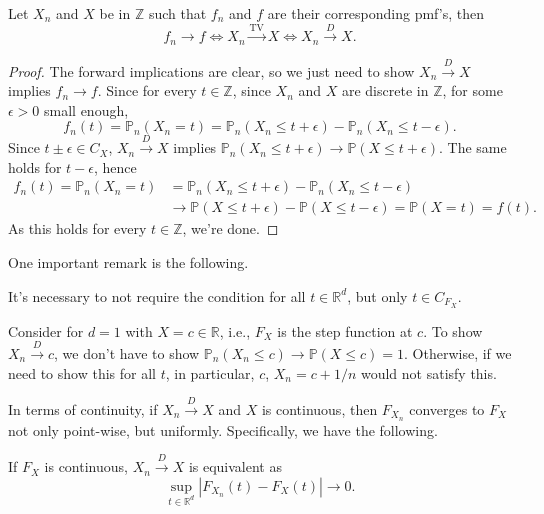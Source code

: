 \begin{proposition}
	Let \(X_n\) and \(X\) be in \(\mathbb{Z} \) such that \(f_n\) and \(f\) are their corresponding pmf's, then
	\[
		f_n \to f
		\iff X_n \overset{\operatorname{TV} }{\to } X
		\iff X_n \overset{D}{\to } X.
	\]
\end{proposition}
\begin{proof}
	The forward implications are clear, so we just need to show \(X_n \overset{D}{\to } X \) implies \(f_n \to f\). Since for every \(t \in \mathbb{Z} \), since \(X_n\) and \(X\) are discrete in \(\mathbb{Z} \), for some \(\epsilon > 0\) small enough,
	\[
		f_n(t)
		= \mathbb{P} _{n}(X_n = t)
		= \mathbb{P} _{n}(X_n \leq t + \epsilon ) - \mathbb{P} _{n}(X_n \leq t - \epsilon ).
	\]
	Since \(t \pm \epsilon \in C_X\), \(X_n \overset{D}{\to } X\) implies \(\mathbb{P} _{n}(X_n \leq t + \epsilon ) \to \mathbb{P} (X \leq t + \epsilon )\). The same holds for \(t - \epsilon \), hence
	\[
		\begin{split}
			f_n(t)
			= \mathbb{P} _{n}(X_n = t)
			 & = \mathbb{P} _{n}(X_n \leq t + \epsilon ) - \mathbb{P} _{n}(X_n \leq t - \epsilon ) \\
			 & \to \mathbb{P} (X \leq t + \epsilon ) - \mathbb{P} (X \leq t - \epsilon )
			= \mathbb{P} (X = t)
			= f(t).
		\end{split}
	\]
	As this holds for every \(t\in \mathbb{Z} \), we're done.
\end{proof}

One important remark is the following.

\begin{remark}
	It's necessary to not require the condition for all \(t \in \mathbb{R} ^d\), but only \(t \in C_{F_X}\).
\end{remark}
\begin{explanation}
	Consider for \(d = 1\) with \(X = c \in \mathbb{R} \), i.e., \(F_X\) is the step function at \(c\). To show \(X_n \overset{D}{\to } c\), we don't have to show \(\mathbb{P} _{n}(X_n \leq c) \to \mathbb{P} (X \leq c) = 1\). Otherwise, if we need to show this for all \(t\), in particular, \(c\), \(X_n = c + 1 / n\) would not satisfy this.
\end{explanation}

In terms of continuity, if \(X_n \overset{D}{\to } X\) and \(X\) is continuous, then \(F_{X_n}\) converges to \(F_X\) not only point-wise, but uniformly. Specifically, we have the following.

\begin{remark}
	If \(F_X\) is continuous, \(X_n \overset{D}{\to } X\) is equivalent as
	\[
		\sup _{t\in \mathbb{R} ^d} \left\vert F_{X_n} (t) - F_X(t) \right\vert \to 0.
	\]
\end{remark}

